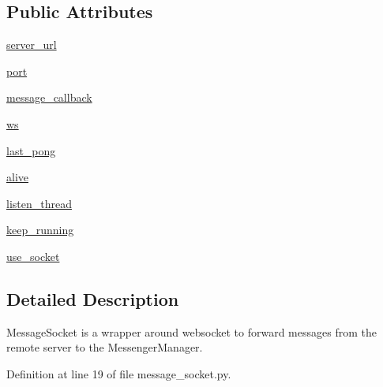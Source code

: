 \subsection*{Public Attributes}
\begin{DoxyCompactItemize}
\item 
\hyperlink{classparlai_1_1messenger_1_1core_1_1message__socket_1_1MessageSocket_abf696f625e3373836dab38b71d0a74a8}{server\+\_\+url}
\item 
\hyperlink{classparlai_1_1messenger_1_1core_1_1message__socket_1_1MessageSocket_ab84d7131041afc06174f38b5ffe86f91}{port}
\item 
\hyperlink{classparlai_1_1messenger_1_1core_1_1message__socket_1_1MessageSocket_a890f6fc26ac81d4139629a7a71928ecb}{message\+\_\+callback}
\item 
\hyperlink{classparlai_1_1messenger_1_1core_1_1message__socket_1_1MessageSocket_abc18127d7b0032aca5f835a300554291}{ws}
\item 
\hyperlink{classparlai_1_1messenger_1_1core_1_1message__socket_1_1MessageSocket_ad7fbb8abac890b60ecab357727f7921b}{last\+\_\+pong}
\item 
\hyperlink{classparlai_1_1messenger_1_1core_1_1message__socket_1_1MessageSocket_a554397deec3d29f09e43c8c4fd526bec}{alive}
\item 
\hyperlink{classparlai_1_1messenger_1_1core_1_1message__socket_1_1MessageSocket_a66beeb65892320ead07b912db4a6eb70}{listen\+\_\+thread}
\item 
\hyperlink{classparlai_1_1messenger_1_1core_1_1message__socket_1_1MessageSocket_a5a966f25c782fd0310fd1cf753f41ecb}{keep\+\_\+running}
\item 
\hyperlink{classparlai_1_1messenger_1_1core_1_1message__socket_1_1MessageSocket_a3bf26d6295a0dc132500c936ada136d8}{use\+\_\+socket}
\end{DoxyCompactItemize}


\subsection{Detailed Description}
\begin{DoxyVerb}MessageSocket is a wrapper around websocket to forward messages from the
remote server to the MessengerManager.
\end{DoxyVerb}
 

Definition at line 19 of file message\+\_\+socket.\+py.



